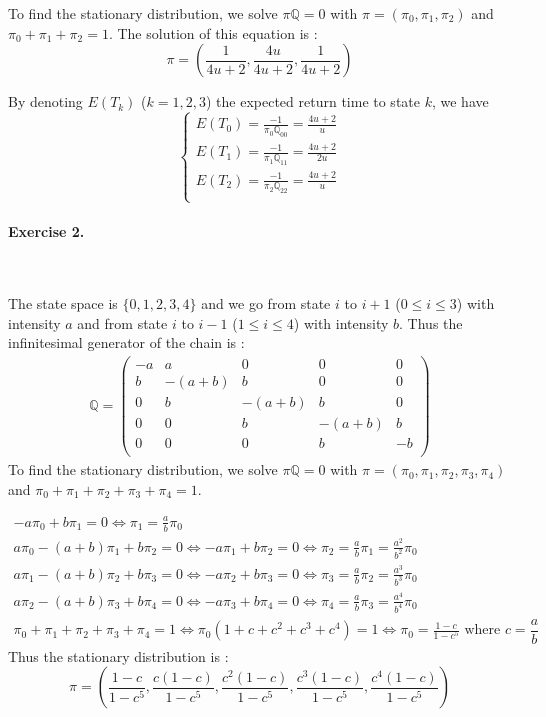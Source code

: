\documentclass{article}
\begin{document}
To find the stationary distribution, we solve $\pi \mathbb{Q}=0$ with $\pi=(\pi_0,\pi_1,\pi_2)$ and $\pi_0+\pi_1+\pi_2=1$.
The solution of this equation is : 
$$\pi=\left(\dfrac{1}{4u+2},\dfrac{4u}{4u+2},\dfrac{1}{4u+2}\right)$$

By denoting $E(T_k)$ ($k=1,2,3$) the expected return time to state $k$, we have 
$$\displaystyle \left \{
    \begin{array}{l}
        E(T_0)=\frac{-1}{\pi_0 \mathbb{Q}_{00}}=\frac{4u+2}{u} \\
		E(T_1)=\frac{-1}{\pi_1 \mathbb{Q}_{11}}=\frac{4u+2}{2u} \\
		E(T_2)=\frac{-1}{\pi_2 \mathbb{Q}_{22}}=\frac{4u+2}{u} \\
    \end{array}
\right. 
$$

\newpage
\paragraph{Exercise 2.}
\

The state space is $\{0,1,2,3,4\}$ and we go from state $i$ to $i+1$  ($0 \leq i \leq 3$) with intensity $a$ and from state $i$ to $i-1$ ($1 \leq i \leq 4$) with intensity $b$. Thus the infinitesimal generator of the chain is : 
\begin{align*}
\mathbb{Q}=
\begin{pmatrix}
-a & a & 0 & 0 & 0 \\
b & -(a+b) & b & 0 &0  \\
0 & b & -(a+b) & b & 0 \\
0 & 0 & b & -(a+b) & b \\
0 & 0 & 0 & b & -b \\
\end{pmatrix}
\end{align*}
To find the stationary distribution, we solve $\pi \mathbb{Q}=0$ with $\pi=(\pi_0,\pi_1,\pi_2,\pi_3,\pi_4)$ and $\pi_0+\pi_1+\pi_2+\pi_3+\pi_4=1$.
 
\begin{gather*}
-a\pi_0+b\pi_1=0 \iff \pi_1=\frac{a}{b}\pi_0 \\
a\pi_0-(a+b)\pi_1+b\pi_2=0 \iff -a\pi_1+b\pi_2=0 \iff \pi_2=\frac{a}{b}\pi_1=\frac{a^2}{b^2}\pi_0 \\
a\pi_1-(a+b)\pi_2+b\pi_3=0 \iff -a\pi_2+b\pi_3=0 \iff \pi_3=\frac{a}{b}\pi_2=\frac{a^3}{b^3}\pi_0 \\
a\pi_2-(a+b)\pi_3+b\pi_4=0 \iff -a\pi_3+b\pi_4=0 \iff \pi_4=\frac{a}{b}\pi_3=\frac{a^4}{b^4}\pi_0 \\
\pi_0+\pi_1+\pi_2+\pi_3+\pi_4=1 \iff \pi_0(1+c+c^2+c^3+c^4)=1 \iff \pi_0=\frac{1-c}{1-c^5} \text{ where $c=\dfrac{a}{b}$ } 
\end{gather*}
Thus the stationary distribution is :
$$\pi=\left( \frac{1-c}{1-c^5},\frac{c(1-c)}{1-c^5},\frac{c^2(1-c)}{1-c^5},\frac{c^3(1-c)}{1-c^5},\frac{c^4(1-c)}{1-c^5} \right)$$
\end{document}
